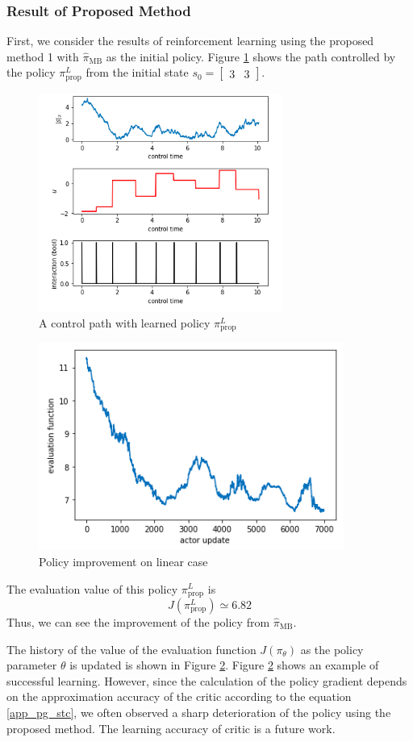 \documentclass[english, dvipdfmx]{ampmt}             %
\begin{document}
\subsubsection{Result of Proposed Method}
First, we consider the results of reinforcement learning using the proposed method 1 with $\hat{\pi}_{\textrm{MB}}$ as the initial policy. Figure \ref{proposed_1_linear} shows the path controlled by the policy $\pi_{\textrm{prop}}^L$ from the initial state $s_0=\begin{bmatrix}3 & 3\end{bmatrix}$.
\begin{figure}[t]
	\centering
 	\includegraphics[width=8cm]{proposed_1_linear.png}
 	\caption{A control path with learned policy $\pi_{\textrm{prop}}^L$} \label{proposed_1_linear}
\end{figure}
\begin{figure}[H]
	\centering
 	\includegraphics[width=10cm]{evaluation_log_linear.png}
 	\caption{Policy improvement on linear case} \label{evaluation_log_linear}
\end{figure}
The evaluation value of this policy $\pi_{\textrm{prop}}^L$ is
\begin{equation}
	J(\pi_{\textrm{prop}}^L) \simeq 6.82
\end{equation}
Thus, we can see the improvement of the policy from $\hat{\pi}_{\textrm{MB}}$.\par
The history of the value of the evaluation function $J( \pi_{\theta})$ as the policy parameter $\theta$ is updated is shown in Figure \ref{evaluation_log_linear}.
Figure \ref{evaluation_log_linear} shows an example of successful learning. However, since the calculation of the policy gradient depends on the approximation accuracy of the critic according to the equation \eqref{app_pg_stc}, we often observed a sharp deterioration of the policy using the proposed method. The learning accuracy of critic is a future work.
\end{document}
